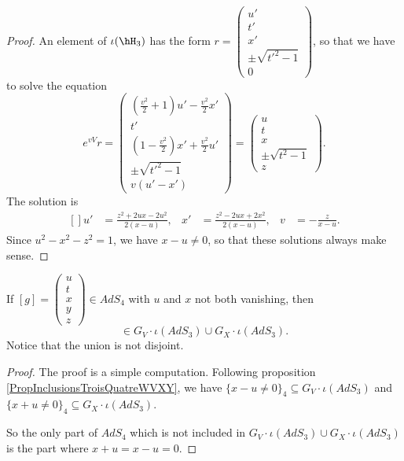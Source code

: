 \begin{proof}
An element of $\iota(\hH_3)$ has the form
$r=\begin{pmatrix}
	u'	\\ 
	t'	\\ 
	x'	\\ 
	\pm\sqrt{t'^2-1}	\\ 
	0	
\end{pmatrix}$,
so that we have to solve the equation
\begin{equation}
	 e^{vV}r=\begin{pmatrix}
	\left( \frac{ v^2 }{ 2 }+1 \right)u'-\frac{ v^2 }{ 2 }x'	\\ 
	t'	\\ 
	\left( 1-\frac{ v^2 }{ 2 } \right)x'+\frac{ v^2 }{ 2 }u'	\\ 
	\pm\sqrt{t'^2-1}	\\ 
	v(u'-x')	
\end{pmatrix}
=
\begin{pmatrix}
	u	\\ 
	t	\\ 
	x	\\ 
	\pm\sqrt{t^2-1}	\\ 
	z	
\end{pmatrix}.
\end{equation}
The solution is
\begin{equation}
	\begin{aligned}[]
		u'&=\frac{ z^2+2ux-2u^2 }{ 2(x-u) },&x'&=\frac{ z^2-2ux+2x^2 }{ 2(x-u) },&v&=-\frac{ z }{ x-u }.
	\end{aligned}
\end{equation}
Since $u^2-x^2-z^2=1$, we have $x-u\neq 0$, so that these solutions always make sense.
\end{proof}

\begin{lemma}
If $[g]=\begin{pmatrix}
	u	\\ 
	t	\\ 
	x	\\ 
	y	\\ 
	z	
\end{pmatrix}\in AdS_4$ with $u$ and $x$ not both vanishing, then 
\begin{equation}
	[g]\in G_V\cdot\iota(AdS_3)\cup G_X\cdot \iota(AdS_3).
\end{equation}
Notice that the union is not disjoint.
\end{lemma}

\begin{proof}
The proof is a simple computation. Following proposition \ref{PropInclusionsTroisQuatreWVXY}, we have $\{ x-u\neq 0 \}_4\subseteq G_V\cdot\iota(AdS_3)$ and $\{ x+u\neq 0 \}_4\subseteq G_X\cdot\iota(AdS_3)$.

So the only part of $AdS_4$ which is not included in $G_V\cdot \iota(AdS_3)\cup G_X\cdot\iota(AdS_3)$ is the part where $x+u=x-u=0$.
\end{proof}

